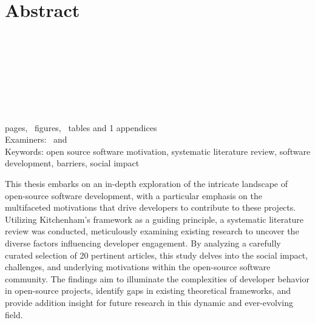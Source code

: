 \section*{Abstract}
\begin{spacing}{1.5}
    \university\\
    \school\\
    \degreeprogramme\\
\end{spacing}

\myname

\textbf{\mytitle}\\
\mysubtitle

\begin{spacing}{1.5}
    \thesistype\\
    \thesisyear\\
    \pageref{myLastPage} pages, \totalfigures~figures, \totaltables~tables and 1 appendices\\
    Examiners: \examinerA~and \examinerB\\
    Keywords: open source software motivation, systematic literature review, software development, barriers, social impact
\end{spacing}

\vspace{1em}
\begin{spacing}{1.0}

    This thesis embarks on an in-depth exploration of the intricate landscape of open-source software development, with a particular emphasis on the multifaceted motivations that drive developers to contribute to these projects. Utilizing Kitchenham's framework as a guiding principle, a systematic literature review was conducted, meticulously examining existing research to uncover the diverse factors influencing developer engagement. By analyzing a carefully curated selection of 20 pertinent articles, this study delves into the social impact, challenges, and underlying motivations within the open-source software community. The findings aim to illuminate the complexities of developer behavior in open-source projects, identify gaps in existing theoretical frameworks, and provide addition insight for future research in this dynamic and ever-evolving field.

\end{spacing}
\clearpage %
